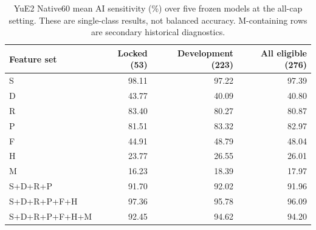 \begin{table}[htbp]\centering\small
\begin{tabular}{lrrr}\toprule
Feature set & Locked (53) & Development (223) & All eligible (276)\\\midrule
S & 98.11 & 97.22 & 97.39\\
D & 43.77 & 40.09 & 40.80\\
R & 83.40 & 80.27 & 80.87\\
P & 81.51 & 83.32 & 82.97\\
F & 44.91 & 48.79 & 48.04\\
H & 23.77 & 26.55 & 26.01\\
M & 16.23 & 18.39 & 17.97\\
S+D+R+P & 91.70 & 92.02 & 91.96\\
S+D+R+P+F+H & 97.36 & 95.78 & 96.09\\
S+D+R+P+F+H+M & 92.45 & 94.62 & 94.20\\
\bottomrule\end{tabular}
\caption{YuE2 Native60 mean AI sensitivity (\%) over five frozen models at the all-cap setting. These are single-class results, not balanced accuracy. M-containing rows are secondary historical diagnostics.}
\label{tab:native60-transfer}\end{table}
